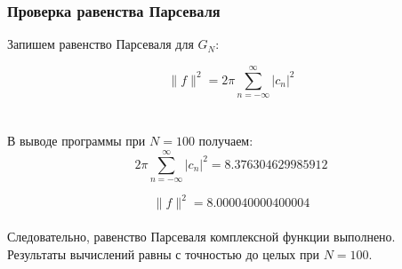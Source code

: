 \documentclass[a5paper, 10pt]{article}
\theoremstyle{definition}
\theoremstyle{plain}
\theoremstyle{remark}
\begin{document}
\subsubsection{Проверка равенства Парсеваля}

Запишем равенство Парсеваля для $G_N$:

\begin{equation}
\| f \|^2 = 2 \pi \sum \limits_{n = -\infty}^{\infty} |c_n |^2
\end{equation}
\\
\\
 В выводе программы при $N=100$ получаем:
\begin{equation*}
2 \pi \sum \limits_{n = -\infty}^{\infty} |c_n |^2 = 8.376304629985912
\end{equation*}

\begin{equation*}
\| f \|^2  = 8.000040000400004
\end{equation*}
\\
Следовательно, равенство Парсеваля комплексной функции выполнено. Результаты вычислений равны с точностью до целых при $N = 100$.






 
\end{document}
